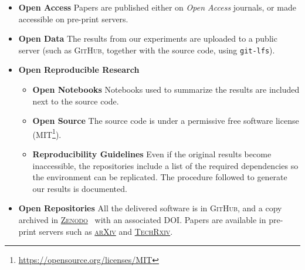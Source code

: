 \begin{itemize}
    \item \textbf{Open Access} Papers are published either on \emph{Open Access} journals,
        or made accessible on pre-print servers.
    \item \textbf{Open Data} The results from our experiments are uploaded to a public
        server (such as \textsc{GitHub}, together with the source code, using \texttt{git-lfs}).
    \item \textbf{Open Reproducible Research} 
        \begin{itemize}
            \item \textbf{Open Notebooks} Notebooks used to summarize the results are
                included next to the source code.
            \item \textbf{Open Source} The source code is under a permissive free software license
                (MIT\footnote{\url{https://opensource.org/licenses/MIT}}).
            \item \textbf{Reproducibility Guidelines} Even if the original results become
            inaccessible, the repositories include a list of the required dependencies so the
            environment can be replicated. The procedure followed to generate our results is documented.
        \end{itemize}
    \item \textbf{Open Repositories} All the delivered software is in \textsc{GitHub},
        and a copy archived in \href{https://zenodo.org/}{\textsc{Zenodo}}~\cite{zenodo} with an
        associated DOI. Papers are available in pre-print servers such as
        \href{https://arxiv.org/}{\textsc{arXiv}} and
        \href{https://www.techrxiv.org}{\textsc{TechRxiv}}.
\end{itemize}
